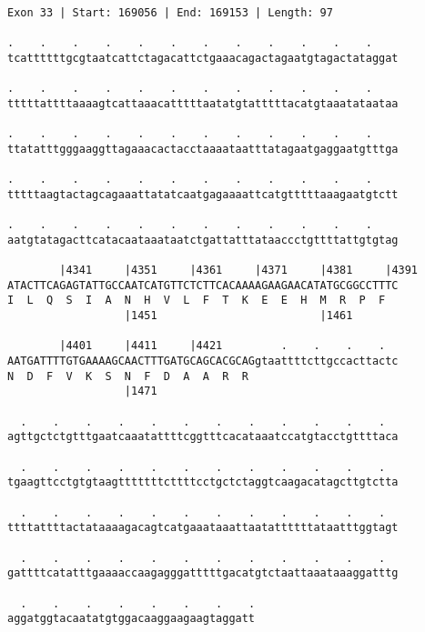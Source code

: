 \documentclass{article}
\begin{document}
\newpage
\begin{Verbatim}[fontfamily=courier]
Exon 33 | Start: 169056 | End: 169153 | Length: 97

.    .    .    .    .    .    .    .    .    .    .    .    
tcattttttgcgtaatcattctagacattctgaaacagactagaatgtagactataggat

.    .    .    .    .    .    .    .    .    .    .    .    
tttttattttaaaagtcattaaacatttttaatatgtatttttacatgtaaatataataa

.    .    .    .    .    .    .    .    .    .    .    .    
ttatatttgggaaggttagaaacactacctaaaataatttatagaatgaggaatgtttga

.    .    .    .    .    .    .    .    .    .    .    .    
tttttaagtactagcagaaattatatcaatgagaaaattcatgtttttaaagaatgtctt

.    .    .    .    .    .    .    .    .    .    .    .    
aatgtatagacttcatacaataaataatctgattatttataaccctgttttattgtgtag

        |4341     |4351     |4361     |4371     |4381     |4391
ATACTTCAGAGTATTGCCAATCATGTTCTCTTCACAAAAGAAGAACATATGCGGCCTTTC
I  L  Q  S  I  A  N  H  V  L  F  T  K  E  E  H  M  R  P  F  
                  |1451                         |1461       

        |4401     |4411     |4421         .    .    .    .  
AATGATTTTGTGAAAAGCAACTTTGATGCAGCACGCAGgtaattttcttgccacttactc
N  D  F  V  K  S  N  F  D  A  A  R  R                       
                  |1471                                     

  .    .    .    .    .    .    .    .    .    .    .    .  
agttgctctgtttgaatcaaatattttcggtttcacataaatccatgtacctgttttaca

  .    .    .    .    .    .    .    .    .    .    .    .  
tgaagttcctgtgtaagtttttttcttttcctgctctaggtcaagacatagcttgtctta

  .    .    .    .    .    .    .    .    .    .    .    .  
ttttattttactataaaagacagtcatgaaataaattaatattttttataatttggtagt

  .    .    .    .    .    .    .    .    .    .    .    .  
gattttcatatttgaaaaccaagagggatttttgacatgtctaattaaataaaggatttg

  .    .    .    .    .    .    .    .
aggatggtacaatatgtggacaaggaagaagtaggatt
\end{Verbatim}
\newpage
\end{document}
